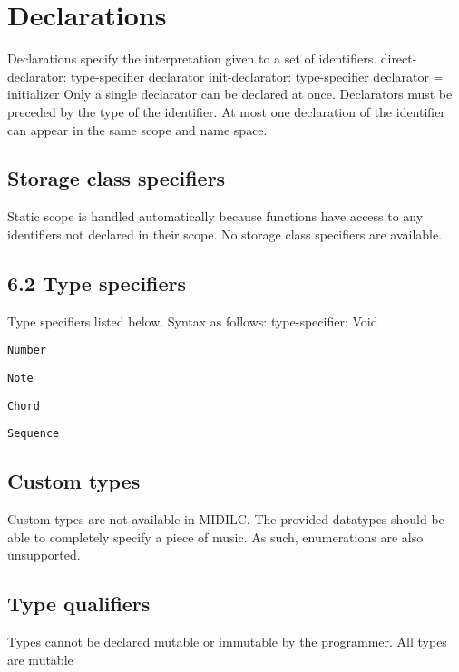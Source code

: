 \documentclass[12pt,A4]{book}
\begin{document}
\section{Declarations}
Declarations specify the interpretation given to a set of identifiers.
direct-declarator:    type-specifier declarator
init-declarator:    type-specifier declarator = initializer
Only a single declarator can be declared at once.  Declarators must be preceded by the type of the identifier.  At most one declaration of the identifier can appear in the same scope and name space.  
\subsection{Storage class specifiers}
Static scope is handled automatically because functions have access to any identifiers not declared in their scope. No storage class specifiers are available.
\subsection{6.2 Type specifiers}
Type specifiers listed below.  Syntax as follows:
type-specifier:    Void

    \verb|Number|

    \verb|Note|

    \verb|Chord|

    \verb|Sequence|
\subsection{Custom types}
Custom types are not available in MIDILC.  The provided datatypes should be able to completely specify a piece of music. As such, enumerations are also unsupported.
\subsection{Type qualifiers}
Types cannot be declared mutable or immutable by the programmer.  All types are mutable
\end{document}
